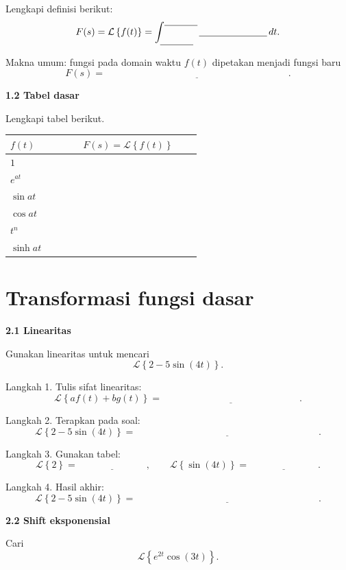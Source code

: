 \documentclass[11pt,a4paper]{article}
\newcommand{\Lcal}{\mathcal{L}}
\newcommand{\Lap}[1]{\Lcal\left\{#1\right\}}
\newcommand{\stepbox}[1]{\vspace{0.2cm}\colorbox{iteraLight}{\parbox{0.98\linewidth}{\textbf{#1}}}\vspace{0.15cm}}
\begin{document}
Lengkapi definisi berikut:
\[
F(s)=\Lap{f(t)}=\int_{\underline{\hspace{1.2cm}}}^{\underline{\hspace{1.2cm}}}
\underline{\hspace{2.5cm}}\,dt.
\]

Makna umum: fungsi pada domain waktu $f(t)$ dipetakan menjadi fungsi baru
\[
F(s)=\underline{\hspace{8cm}}.
\]

\stepbox{1.2 Tabel dasar}
Lengkapi tabel berikut.

\begin{center}
\renewcommand{\arraystretch}{1.55}
\begin{tabular}{|m{0.32\linewidth}|m{0.52\linewidth}|}
\hline
$f(t)$ & $F(s)=\Lap{f(t)}$\\
\hline
$1$ & \dotfill\\
\hline
$e^{at}$ & \dotfill\\
\hline
$\sin at$ & \dotfill\\
\hline
$\cos at$ & \dotfill\\
\hline
$t^n$ & \dotfill\\
\hline
$\sinh at$ & \dotfill\\
\hline
\end{tabular}
\end{center}

\section{Transformasi fungsi dasar}
\stepbox{2.1 Linearitas}

Gunakan linearitas untuk mencari
\[
\Lap{2-5\sin(4t)}.
\]

Langkah 1. Tulis sifat linearitas:
\[
\Lap{af(t)+bg(t)}=\underline{\hspace{6cm}}.
\]

Langkah 2. Terapkan pada soal:
\[
\Lap{2-5\sin(4t)}
=
\underline{\hspace{8cm}}.
\]

Langkah 3. Gunakan tabel:
\[
\Lap{2}=\underline{\hspace{3cm}},
\qquad
\Lap{\sin(4t)}=\underline{\hspace{3cm}}.
\]

Langkah 4. Hasil akhir:
\[
\Lap{2-5\sin(4t)}=
\underline{\hspace{8cm}}.
\]

\stepbox{2.2 Shift eksponensial}

Cari
\[
\Lap{e^{2t}\cos(3t)}.
\]
\end{document}
